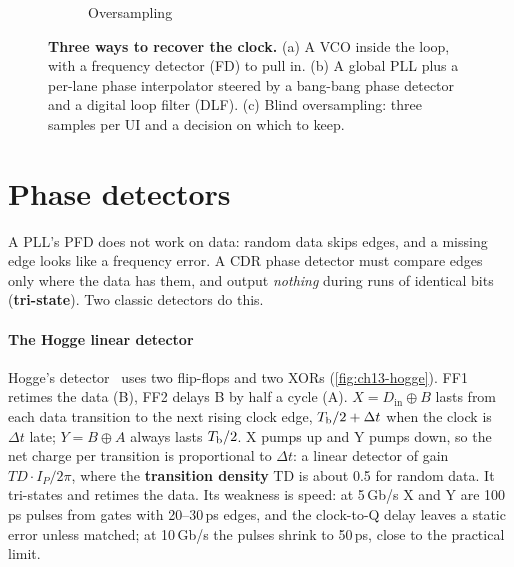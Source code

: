 \begin{figure}[tbp]
\begin{subfigure}[b]{0.3\linewidth}
\caption{Oversampling}
\end{subfigure}
\caption{\textbf{Three ways to recover the clock.} (a) A VCO inside the loop, with a frequency detector (FD) to pull in. (b) A global PLL plus a per-lane phase interpolator steered by a bang-bang phase detector and a digital loop filter (DLF). (c) Blind oversampling: three samples per UI and a decision on which to keep.}
\label{fig:ch13-arch}
\end{figure}

\section{Phase detectors}\label{sec:pd}

A PLL's PFD does not work on data: random data skips edges, and a missing edge looks like a frequency error. A CDR phase detector must compare edges only where the data has them, and output \emph{nothing} during runs of identical bits (\textbf{tri-state}). Two classic detectors do this.

\paragraph{The Hogge linear detector}
Hogge's detector~\cite{p5:hogge1985} uses two flip-flops and two XORs (\cref{fig:ch13-hogge}). FF1 retimes the data (B), FF2 delays B by half a cycle (A). $X = D_\mathrm{in}\oplus B$ lasts from each data transition to the next rising clock edge, $T_\mathrm{b}/2 + \Delta t$ when the clock is $\Delta t$ late; $Y = B\oplus A$ always lasts $T_\mathrm{b}/2$. X pumps up and Y pumps down, so the net charge per transition is proportional to $\Delta t$: a linear detector of gain $TD\cdot I_P/2\pi$, where the \textbf{transition density} TD is about 0.5 for random data. It tri-states and retimes the data. Its weakness is speed: at 5\,Gb/s X and Y are 100\,ps pulses from gates with 20--30\,ps edges, and the clock-to-Q delay leaves a static error unless matched; at 10\,Gb/s the pulses shrink to 50\,ps, close to the practical limit.

